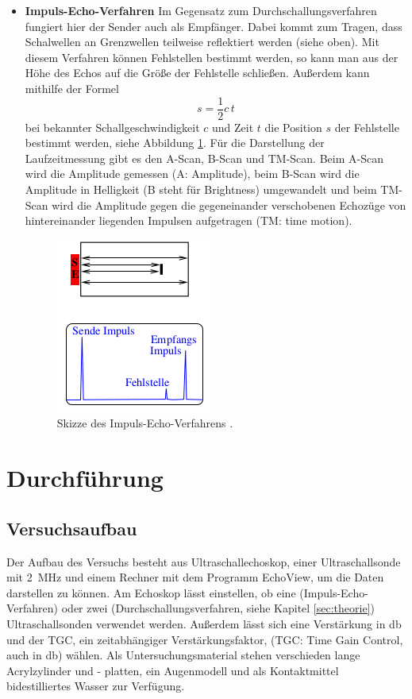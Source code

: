 \begin{itemize}
  \item \textbf{Impuls-Echo-Verfahren}
  Im Gegensatz zum Durchschallungsverfahren fungiert hier der Sender auch als Empfänger.
  Dabei kommt zum Tragen, dass Schalwellen an Grenzwellen teilweise reflektiert werden (siehe oben).
  Mit diesem Verfahren können Fehlstellen bestimmt werden, so kann man aus der
  Höhe des Echos auf die Größe der Fehlstelle schließen. Außerdem kann mithilfe der Formel
  \begin{equation}
    s = \frac{1}{2} c \, t
    \label{eqn:6}
  \end{equation}
  bei bekannter Schallgeschwindigkeit $c$ und Zeit $t$ die Position $s$ der Fehlstelle bestimmt werden, siehe Abbildung \ref{fig:2}.
  Für die Darstellung der Laufzeitmessung gibt es den A-Scan, B-Scan und TM-Scan. Beim A-Scan wird die Amplitude
  gemessen (A: Amplitude), beim B-Scan wird die Amplitude in Helligkeit (B steht für Brightness) umgewandelt und
  beim TM-Scan wird die Amplitude gegen die gegeneinander verschobenen Echozüge von hintereinander liegenden Impulsen aufgetragen (TM: time motion).
  \begin{figure}
    \centering
    \includegraphics[scale=0.5]{impuls.png}
    \caption{Skizze des Impuls-Echo-Verfahrens \cite{anleitung}.}
    \label{fig:2}
  \end{figure}
\end{itemize}
\section{Durchführung}
\subsection{Versuchsaufbau}
Der Aufbau des Versuchs besteht aus Ultraschallechoskop, einer Ultraschallsonde mit
\SI{2}{\mega\hertz} und einem Rechner mit dem Programm EchoView, um die Daten darstellen zu können.
Am Echoskop lässt einstellen, ob eine (Impuls-Echo-Verfahren) oder zwei (Durchschallungsverfahren, siehe Kapitel \ref{sec:theorie})
Ultraschallsonden verwendet werden. Außerdem lässt sich eine Verstärkung in \si{\decibel} und
der TGC, ein zeitabhängiger Verstärkungsfaktor, (TGC: Time Gain Control, auch in \si{\decibel}) wählen. Als Untersuchungsmaterial stehen verschieden lange Acrylzylinder und
- platten, ein Augenmodell und als Kontaktmittel bidestilliertes Wasser zur Verfügung.
